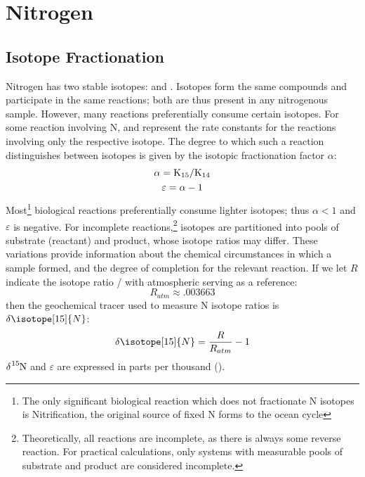 \chapter{Nitrogen}
\section{Isotope Fractionation}
\newcommand{\dN}{\delta\isotope[15]{N}}
\newcommand{\eps}{\varepsilon}
Nitrogen has two stable isotopes:  and . Isotopes form the same compounds and participate in the same reactions; both are thus present in any nitrogenous sample. However, many reactions preferentially consume certain isotopes. For some reaction involving N,  and  represent the rate constants for the reactions involving only the respective isotope. The degree to which such a reaction distinguishes between isotopes is given by the isotopic fractionation factor $\alpha$:
\begin{gather}
    \alpha = \ce{K_{15}/K_{14}}\label{alpha}\\
    \eps = \alpha - 1\label{epsilon}
\end{gather}
Most\footnote{The only significant biological reaction which does not fractionate N isotopes is Nitrification, the original source of fixed N forms to the ocean cycle} biological reactions preferentially consume lighter isotopes; thus $\alpha<1$ and $\eps$ is negative. For incomplete reactions,\footnote{Theoretically, all reactions are incomplete, as there is always some reverse reaction. For practical calculations, only systems with measurable pools of substrate and product are considered incomplete.} isotopes are partitioned into pools of substrate (reactant) and product, whose isotope ratios may differ. These variations provide information about the chemical circumstances in which a sample formed, and the degree of completion for the relevant reaction. If we let $R$ indicate the  isotope ratio / with atmospheric  serving as a reference:
\begin{equation}
    R_{atm} \approx.003663\label{R}
\end{equation} then the geochemical tracer used to measure N isotope ratios is $\dN$:
\begin{equation}
   \dN=\frac{R}{R_{atm}}-1\label{d15N}
\end{equation}
$\delta\ce{^{15}N}$ and $\eps$ are expressed in parts per thousand (\unit{\permil}). 
